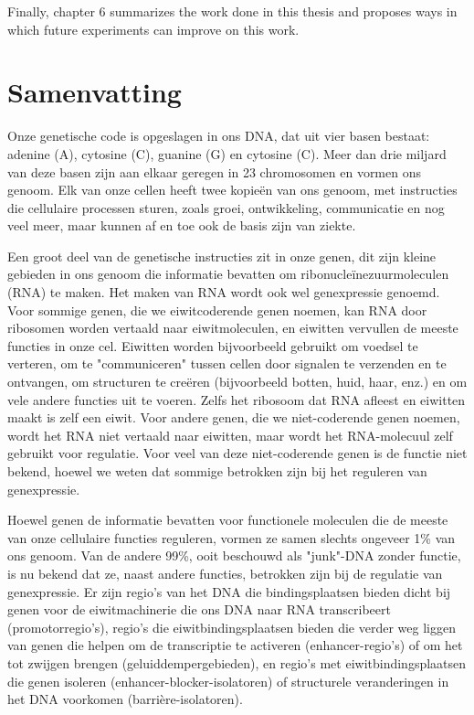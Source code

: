 \begin{appendices}
Finally, chapter 6 summarizes the work done in this thesis and proposes ways in which future experiments can improve on this work. 




\chapter{Samenvatting}
Onze genetische code is opgeslagen in ons DNA, dat uit vier basen bestaat: adenine (A), cytosine (C), guanine (G) en cytosine (C). Meer dan drie miljard van deze basen zijn aan elkaar geregen in 23 chromosomen en vormen ons genoom. Elk van onze cellen heeft twee kopieën van ons genoom, met instructies die cellulaire processen sturen, zoals groei, ontwikkeling, communicatie en nog veel meer, maar kunnen af en toe ook de basis zijn van ziekte.

Een groot deel van de genetische instructies zit in onze genen, dit zijn kleine gebieden in ons genoom die informatie bevatten om ribonucleïnezuurmoleculen (RNA) te maken. Het maken van RNA wordt ook wel genexpressie genoemd. Voor sommige genen, die we eiwitcoderende genen noemen, kan RNA door ribosomen worden vertaald naar eiwitmoleculen, en eiwitten vervullen de meeste functies in onze cel. Eiwitten worden bijvoorbeeld gebruikt om voedsel te verteren, om te "communiceren" tussen cellen door signalen te verzenden en te ontvangen, om structuren te creëren (bijvoorbeeld botten, huid, haar, enz.) en om vele andere functies uit te voeren. Zelfs het ribosoom dat RNA afleest en eiwitten maakt is zelf een eiwit. Voor andere genen, die we niet-coderende genen noemen, wordt het RNA niet vertaald naar eiwitten, maar wordt het RNA-molecuul zelf gebruikt voor regulatie. Voor veel van deze niet-coderende genen is de functie niet bekend, hoewel we weten dat sommige betrokken zijn bij het reguleren van genexpressie.

Hoewel genen de informatie bevatten voor functionele moleculen die de meeste van onze cellulaire functies reguleren, vormen ze samen slechts ongeveer 1\% van ons genoom. Van de andere 99\%, ooit beschouwd als "junk"-DNA zonder functie, is nu bekend dat ze, naast andere functies, betrokken zijn bij de regulatie van genexpressie. Er zijn regio's van het DNA die bindingsplaatsen bieden dicht bij genen voor de eiwitmachinerie die ons DNA naar RNA transcribeert (promotorregio's), regio’s die eiwitbindingsplaatsen bieden die verder weg liggen van genen die helpen om de transcriptie te activeren (enhancer-regio's) of om het tot zwijgen brengen (geluiddempergebieden), en regio’s met eiwitbindingsplaatsen die genen isoleren (enhancer-blocker-isolatoren) of structurele veranderingen in het DNA voorkomen (barrière-isolatoren).


\end{appendices}
